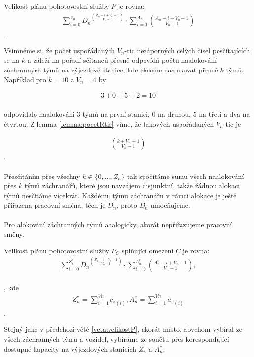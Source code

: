 \begin{veta}\label{veta:velikostP}
  Velikost plánu pohotovostní služby $P$ je rovna:
  \begin{align*}
    \sum_{i = 0}^{Z_n} {D_n}^{\binom{Z_n - i + V_n - 1}{V_n - 1}} \cdot \sum_{i = 0}^{A_n} {\binom{A_n - i + V_n - 1}{V_n - 1}}
  \end{align*}
  .
\end{veta}
\begin{dukaz}
  Všimněme si, že počet uspořádaných $V_n$-tic nezáporných celých čísel posčítajících se na $k$
  a záleží na pořadí sčítanců přesně odpovídá počtu naalokování záchranných týmů na výjezdové stanice, kde chceme naalokovat přesně $k$ týmů.
  Například pro $k = 10$ a $V_n = 4$ by

  \begin{align*}
    3 + 0 + 5 + 2 = 10
    \\
  \end{align*}

  odpovídalo naalokování 3 týmů na první stanici, 0 na druhou, 5 na třetí a dva na čtvrtou.
  Z lemma \ref{lemma:pocetRtic} víme, že takových uspořádaných $V_n$-tic je

  \begin{align}
    \binom{k + V_n - 1}{V_n - 1}
  \end{align}
  .
  \\
  \\
  Přesčítáním přes všechny $k \in \{ 0, \dots, Z_n \}$ tak spočítáme sumu všech naalokování přes $k$ týmů záchranářů, které jsou navzájem disjunktní, takže žádnou alokaci týmů nesčítáme vícekrát.
  Každému týmu záchranářu v rámci alokace je ještě přiřazena pracovní směna, těch je $D_n$, proto $D_n$ umocňujeme. 
  \\
  \\
  Pro alokování záchranných týmů analogicky, akorát nepřiřazujeme pracovní směny.

\end{dukaz}

\begin{veta}
  Velikost plánu pohotovostní služby $P_C$ splňující omezení $C$ je rovna:
  \begin{align*}
    \sum_{i=0}^{Z^c_n}{{D_n}^{\binom{Z^c_n - i + V_n - 1}{V_n - 1}}} \cdot \sum_{i = 0}^{A^c_n}\binom{A^c_n - i + V_n - 1}{V_n - 1},
  \end{align*}
  \\
  , kde
  \begin{align*}
    Z^c_n = \sum_{i=1}^{Vn} {c_z}_{(i)}, A^c_n = \sum_{i=1}^{Vn} {a_z}_{(i)}
  \end{align*}
  .
  \\
\end{veta}
\begin{dukaz}
  Stejný jako v předchozí větě \ref{veta:velikostP}, akorát místo, abychom vybíral ze všech záchranných týmu a vozidel,
  vybíráme ze součtu přes korespondující dostupné kapacity na výjezdových stanicích $Z^c_n$ a $A^c_n$.
  \\
\end{dukaz}

